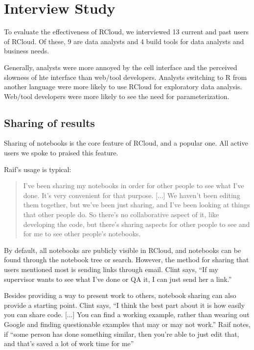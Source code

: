 \section{Interview Study\label{sec:interviews}}

To evaluate the effectiveness of RCloud, we interviewed 13 current and past
users of RCloud. Of these, 9 are data analysts and 4 build tools for data
analysts and business needs.

Generally, analysts were more annoyed by the cell interface and the
perceived slowness of hte interface than web/tool developers. Analysts
switching to R from another language were more likely to use RCloud for
exploratory data analysis. Web/tool developers were more likely to see the
need for parameterization.


\subsection{Sharing of results}
Sharing of notebooks is the core feature of RCloud, and a popular one. All
active users we spoke to praised this feature.

Raif's usage is typical:
\begin{quote}
I've been sharing my notebooks in order for other people to see what
I've done. It's very convenient for that purpose. [...] We haven't
been editing them together, but we've been just sharing, and I've been looking
at things that other people do. So there's no collaborative aspect of it, like
developing the code, but there's sharing aspects for other people to see and for
me to see other people's notebooks.
\end{quote}

By default, all notebooks are publicly visible in RCloud, and notebooks can be
found through the notebook tree or search. However, the method for sharing that
users mentioned most is sending links through email. Clint says, ``If my supervisor
wants to see what I've done or QA it, I can just send her a link.''

Besides providing a way to present work to others, notebook sharing can also
provide a starting point. Clint says, ``I think the best part about it is how
easily you can share code. [...] You can find a working example, rather than wearing
out Google and finding questionable examples that may or may not work.'' Raif
notes, if ``some person has done something similar, then you're able to just
edit that, and that's saved a lot of work time for me''

